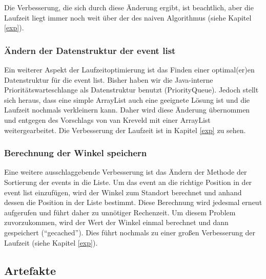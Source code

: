 Die Verbesserung, die sich durch diese Änderung ergibt, ist beachtlich, aber die Laufzeit liegt immer noch weit über der des naiven Algorithmus 
(siehe Kapitel \ref{exp}).

\subsubsection{Ändern der Datenstruktur der event list}

Ein weiterer Aspekt der Laufzeitoptimierung ist das Finden einer optimal(er)en Datenstruktur für die event list. Bisher haben wir die Java-interne 
Prioritätswarteschlange als Datenstruktur benutzt (PriorityQueue). Jedoch stellt sich heraus, dass eine simple ArrayList auch eine geeignete Lösung
ist und die Laufzeit nochmals verkleinern kann. Daher wird diese Änderung übernommen und entgegen des Vorschlags von van Kreveld mit einer ArrayList
weitergearbeitet. Die Verbesserung der Laufzeit ist in Kapitel \ref{exp} zu sehen.

\subsubsection{Berechnung der Winkel speichern}

Eine weitere ausschlaggebende Verbesserung ist das Ändern der Methode der Sortierung der events in die Liste. Um das event an die richtige Position 
in der event list einzufügen, wird der Winkel zum Standort berechnet und anhand dessen die Position in der Liste bestimmt. Diese Berechnung wird 
jedesmal erneut aufgerufen und führt daher zu unnötiger Rechenzeit. Um diesem Problem zuvorzukommen, wird der Wert der Winkel einmal berechnet und 
dann gespeichert (``gecached''). Dies führt nochmals zu einer großen Verbesserung der Laufzeit (siehe Kapitel \ref{exp}).

\subsection{Artefakte}


